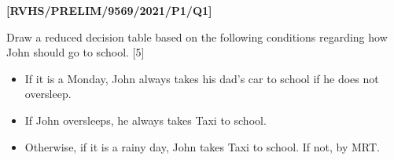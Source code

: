 \item \textbf{{[}RVHS/PRELIM/9569/2021/P1/Q1{]} }

Draw a reduced decision table based on the following conditions regarding
how John should go to school. \hfill{}{[}5{]}
\begin{itemize}
\item If it is a Monday, John always takes his dad\textquoteright s car
to school if he does not oversleep. 
\item If John oversleeps, he always takes Taxi to school. 
\item Otherwise, if it is a rainy day, John takes Taxi to school. If not,
by MRT. 
\end{itemize}
